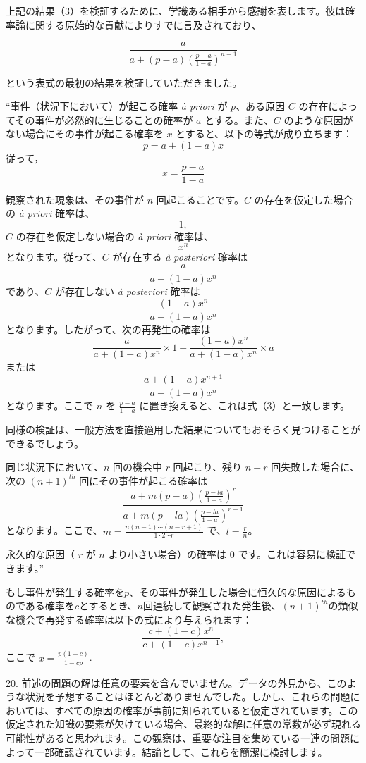 \documentclass[a4paper,11pt,openany]{ltjsbook}
\begin{document}
上記の結果（3）を検証するために、学識ある相手から感謝を表します。彼は確率論に関する原始的な貢献によりすでに言及されており、

\[
\frac{a}{a+(p-a)\left(\frac{p-a}{1-a}\right)^{n-1}}
\]

という表式の最初の結果を検証していただきました。

``事件（状況下において）が起こる確率 \textit{\`{a} priori} が \( p \)、ある原因 \( C \) の存在によってその事件が必然的に生じることの確率が \( a \) とする。また、\( C \) のような原因がない場合にその事件が起こる確率を \( x \) とすると、以下の等式が成り立ちます：
\[
p = a + (1-a)x
\]
従って，
\[
x = \frac{p - a}{1 - a}
\]

観察された現象は、その事件が \( n \) 回起こることです。\( C \) の存在を仮定した場合の \textit{\`{a} priori} 確率は、
\[
1,
\]
\( C \) の存在を仮定しない場合の \textit{\`{a} priori} 確率は、
\[
x^n
\]
となります。従って、\( C \) が存在する \textit{\`{a} posteriori} 確率は
\[
\frac{a}{a + (1-a)x^n}
\]
であり、\( C \) が存在しない \textit{\`{a} posteriori} 確率は
\[
\frac{(1-a)x^n}{a + (1-a)x^n}
\]
となります。したがって、次の再発生の確率は
\[
\frac{a}{a + (1-a)x^n} \times 1 + \frac{(1-a)x^n}{a + (1-a)x^n} \times a
\]
または
\[
\frac{a + (1-a)x^{n+1}}{a + (1-a)x^n}
\]
となります。ここで \( n \) を \( \displaystyle \frac{p - a}{1 - a} \) に置き換えると、これは式（3）と一致します。

同様の検証は、一般方法を直接適用した結果についてもおそらく見つけることができるでしょう。

同じ状況下において、\( n \) 回の機会中 \( r \) 回起こり、残り \( n-r \) 回失敗した場合に、次の \( (n+1)^{\mathit{th}} \) 回にその事件が起こる確率は
\[
\frac{a + m(p - a)\left(\frac{p - la}{1 - a}\right)^r}
     {a + m(p - la)\left(\frac{p - la}{1 - a}\right)^{r-1}}
\]
となります。ここで、\( m = \displaystyle \frac{n(n-1) \cdots (n-r+1)}{1 \cdot 2 \cdots r} \) で、\( l = \frac{r}{n} \)。

永久的な原因（ \( r \) が \( n \) より小さい場合）の確率は 0 です。これは容易に検証できます。''

もし事件が発生する確率を$p$、その事件が発生した場合に恒久的な原因によるものである確率を$c$とするとき、$n$回連続して観察された発生後、${(n+1)}^{\mathit{th}}$の類似な機会で再発する確率は以下の式により与えられます：
\[
\frac{c + (1-c)x^n}{c + (1-c)x^{n-1}},
\]
ここで $\displaystyle x = \frac{p(1-c)}{1-cp}$.

20. 前述の問題の解は任意の要素を含んでいません。データの外見から、このような状況を予想することはほとんどありませんでした。しかし、これらの問題においては、すべての原因の確率が事前に知られていると仮定されています。この仮定された知識の要素が欠けている場合、最終的な解に任意の常数が必ず現れる可能性があると思われます。この観察は、重要な注目を集めている一連の問題によって一部確認されています。結論として、これらを簡潔に検討します。
\end{document}
